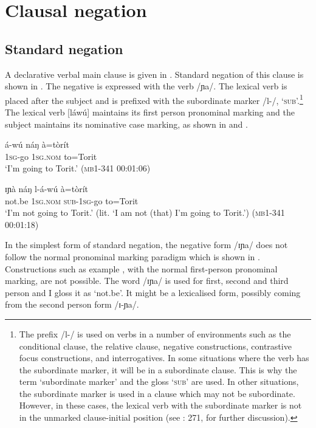 \documentclass[output=paper,colorlinks,citecolor=brown,draftmode]{langscibook}
\begin{document}
\section{Clausal negation} \label{sec:lop:2}
\subsection{Standard negation} \label{sec:lop:2.1}
\largerpage

A declarative verbal main clause is given in . Standard negation of this clause is shown in . The negative is expressed with the verb /ɲa/. The lexical verb is placed after the subject and is prefixed with the subordinate marker /l-/, ‘\textsc{sub}’.\footnote{The prefix /l-/ is used on verbs in a number of environments such as the conditional clause, the relative clause, negative constructions, contrastive focus constructions, and interrogatives. In some situations where the verb has the subordinate marker, it will be in a subordinate clause. This is why the term ‘subordinate marker' and the gloss ‘\textsc{sub}’ are used. In other situations, the subordinate marker is used in a clause which may not be subordinate.  However, in these cases, the lexical verb with the subordinate marker is not in the unmarked clause-initial position (see \citealt{Moodie2019}: 271, for further discussion).} The lexical verb [láwú] maintains its first person pronominal marking and the subject maintains its nominative case marking, as shown in  and .

\ea\label{ex:lop:1}
    \gll á-wú náŋ à=tòrít \\ 
         1\textsc{sg}{}-go 1\textsc{sg.nom} to=Torit \\
    \glt ‘I’m going to Torit.’ (\textsc{mb1-341} 00:01:06)
\z 

\ea\label{ex:lop:2}
    \gll ɪɲà náŋ l-á-wú à=tòrít  \\
         not.be 1\textsc{sg.nom} \textsc{sub}{}-1\textsc{sg}{}-go to=Torit  \\
    \glt `I’m not going to Torit.' (lit. ‘I am not (that) I’m going to Torit.') (\textsc{mb1}-341 00:01:18)
\z

In the simplest form of standard negation, the negative form /ɪɲa/ does not follow the normal pronominal marking paradigm which is shown in . Constructions such as example , with the normal first-person pronominal marking, are not possible. The word /ɪɲa/ is used for first, second and third person and I gloss it as ‘not.be’. It might be a lexicalised form, possibly coming from the second person form /ɪ-ɲa/. 
 
\end{document}
